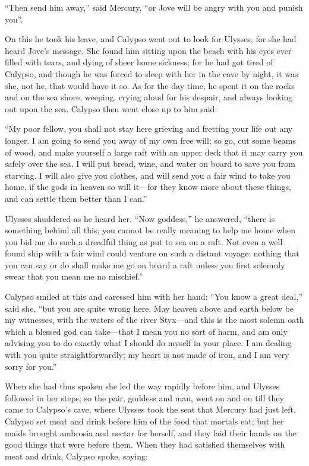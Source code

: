 “Then send him away,” said Mercury, “or Jove will be angry with you and punish
you”.

On this he took his leave, and Calypso went out to look for Ulysses, for she
had heard Jove’s message. She found him sitting upon the beach with his eyes
ever filled with tears, and dying of sheer home sickness; for he had got tired
of Calypso, and though he was forced to sleep with her in the cave by night, it
was she, not he, that would have it so. As for the day time, he spent it on the
rocks and on the sea shore, weeping, crying aloud for his despair, and always
looking out upon the sea. Calypso then went close up to him said:

“My poor fellow, you shall not stay here grieving and fretting your life out
any longer. I am going to send you away of my own free will; so go, cut some
beams of wood, and make yourself a large raft with an upper deck that it may
carry you safely over the sea. I will put bread, wine, and water on board to
save you from starving. I will also give you clothes, and will send you a fair
wind to take you home, if the gods in heaven so will it—for they know more
about these things, and can settle them better than I can.”

Ulysses shuddered as he heard her. “Now goddess,” he answered, “there is
something behind all this; you cannot be really meaning to help me home when
you bid me do such a dreadful thing as put to sea on a raft. Not even a well
found ship with a fair wind could venture on such a distant voyage: nothing
that you can say or do shall make me go on board a raft unless you first
solemnly swear that you mean me no mischief.”

Calypso smiled at this and caressed him with her hand: “You know a great deal,”
said she, “but you are quite wrong here. May heaven above and earth below be my
witnesses, with the waters of the river Styx—and this is the most solemn oath
which a blessed god can take—that I mean you no sort of harm, and am only
advising you to do exactly what I should do myself in your place. I am dealing
with you quite straightforwardly; my heart is not made of iron, and I am very
sorry for you.”

When she had thus spoken she led the way rapidly before him, and Ulysses
followed in her steps; so the pair, goddess and man, went on and on till they
came to Calypso’s cave, where Ulysses took the seat that Mercury had just left.
Calypso set meat and drink before him of the food that mortals eat; but her
maids brought ambrosia and nectar for herself, and they laid their hands on the
good things that were before them. When they had satisfied themselves with meat
and drink, Calypso spoke, saying:

